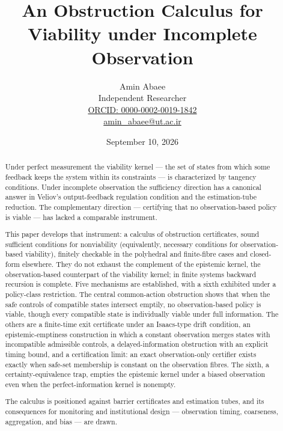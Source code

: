 \documentclass[11pt]{article}
\theoremstyle{definition}
\begin{document}
\title{An Obstruction Calculus for Viability under Incomplete Observation}
\author{Amin Abaee\\[0.35em]
{\small Independent Researcher}\\[0.55em]
{\small\href{https://orcid.org/0000-0002-0019-1842}{ORCID: 0000-0002-0019-1842}}\\[0.3em]
{\small\href{mailto:amin\_abaee@ut.ac.ir}{amin\_abaee@ut.ac.ir}}}
\date{September 10, 2026}
\maketitle

\begin{abstract}

Under perfect measurement the viability kernel --- the set of states
from which some feedback keeps the system within its constraints --- is
characterized by tangency conditions. Under incomplete observation the
sufficiency direction has a canonical answer in Veliov's
output-feedback regulation condition and the estimation-tube reduction.
The complementary direction --- certifying that no observation-based
policy is viable --- has lacked a comparable instrument.

This paper develops that instrument: a calculus of obstruction
certificates, sound sufficient conditions for nonviability (equivalently,
necessary conditions for observation-based viability), finitely
checkable in the polyhedral and finite-fibre cases and closed-form elsewhere. They do not exhaust the complement of the epistemic kernel, the observation-based counterpart of the viability kernel; in finite systems backward recursion is complete. Five mechanisms are established, with a sixth exhibited under a
policy-class restriction. The central common-action obstruction shows
that when the safe controls of compatible states intersect emptily, no
observation-based policy is viable, though every compatible state is
individually viable under full information. The others are a finite-time
exit certificate under an Isaacs-type drift condition, an
epistemic-emptiness construction in which a constant observation merges
states with incompatible admissible controls, a delayed-information
obstruction with an explicit timing bound, and a certification limit:
an exact observation-only certifier exists exactly when safe-set
membership is constant on the observation fibres. The sixth, a
certainty-equivalence trap, empties the epistemic kernel under a biased
observation even when the perfect-information kernel is nonempty.

The calculus is positioned against barrier certificates and estimation
tubes, and its consequences for monitoring and institutional design ---
observation timing, coarseness, aggregation, and bias --- are drawn.

\end{abstract}
\end{document}
